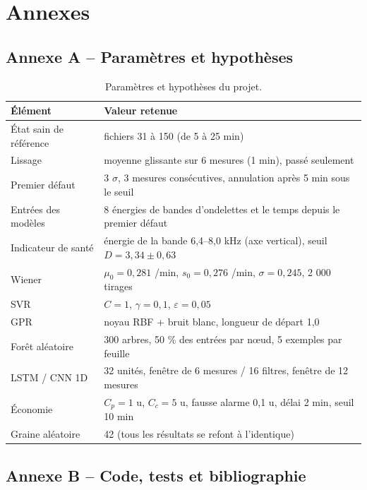 \chapter*{Annexes}

\section*{Annexe A -- Paramètres et hypothèses}

\begin{table}[H]
\centering\small
\begin{tabularx}{\linewidth}{lY}
\toprule
Élément & Valeur retenue \\
\midrule
État sain de référence & fichiers 31 à 150 (de 5 à 25 min) \\
Lissage & moyenne glissante sur 6 mesures (1 min), passé seulement \\
Premier défaut & 3 $\sigma$, 3 mesures consécutives, annulation après 5 min sous le seuil \\
Entrées des modèles & 8 énergies de bandes d'ondelettes et le temps depuis le premier défaut \\
Indicateur de santé & énergie de la bande 6,4--8,0 kHz (axe vertical), seuil $D = 3{,}34 \pm 0{,}63$ \\
Wiener & $\mu_0 = 0{,}281$ /min, $s_0 = 0{,}276$ /min, $\sigma = 0{,}245$, 2 000 tirages \\
SVR & $C = 1$, $\gamma = 0{,}1$, $\varepsilon = 0{,}05$ \\
GPR & noyau RBF + bruit blanc, longueur de départ 1,0 \\
Forêt aléatoire & 300 arbres, 50 \% des entrées par nœud, 5 exemples par feuille \\
LSTM / CNN 1D & 32 unités, fenêtre de 6 mesures / 16 filtres, fenêtre de 12 mesures \\
Économie & $C_p = 1$ u, $C_c = 5$ u, fausse alarme 0,1 u, délai 2 min, seuil 10 min \\
Graine aléatoire & 42 (tous les résultats se refont à l'identique) \\
\bottomrule
\end{tabularx}
\caption[Paramètres et hypothèses du projet]{Paramètres et hypothèses du projet.}
\label{tab:parametres}
\end{table}

\section*{Annexe B -- Code, tests et bibliographie}


